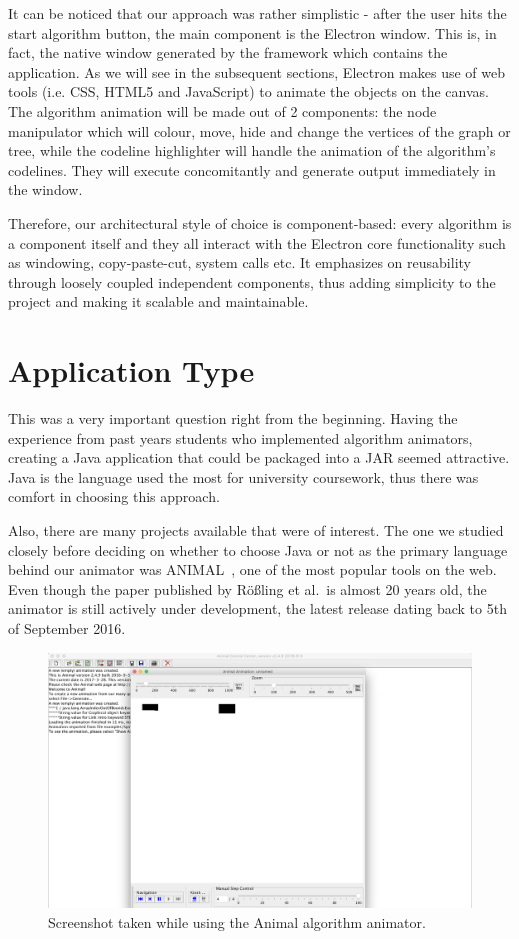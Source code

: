 \documentclass{l4proj}
\begin{document}
It can be noticed that our approach was rather simplistic - after the user hits the start algorithm button, the main
component is the Electron window. This is, in fact, the native window generated by the framework which contains the application. As we will see in the subsequent sections, Electron makes use of web tools (i.e. CSS, HTML5 and JavaScript) to animate the objects on the
canvas. The algorithm animation will be made out of 2 components: the node manipulator which will colour, move,
hide and change the vertices of the graph or tree, while the codeline highlighter will handle the animation of the
algorithm's codelines. They will execute concomitantly and generate output immediately in the window.

Therefore, our architectural style of choice is component-based: every algorithm is a component itself and they all
interact with the Electron core functionality such as windowing, copy-paste-cut, system calls etc. It emphasizes on
reusability through loosely coupled independent components, thus adding simplicity to the project and making it
scalable and maintainable.

\section{Application Type}

This was a very important question right from the beginning. Having the experience from past years students who
implemented algorithm animators, creating a Java application that could be packaged into a JAR seemed attractive. Java is the
language used the most for university coursework, thus there was comfort in choosing this approach.

Also, there are many projects available that were of interest. The one we studied closely before deciding on whether to
choose Java or not as the primary language behind our animator was ANIMAL~\cite{animal-algo-animation}, one of the most popular tools on the
web. Even though the paper published by Rößling et al.\ is almost 20 years old, the animator is still actively under
development, the latest release dating back to 5th of September 2016.

\begin{figure}[!ht]
    \centering
    \includegraphics[scale=0.25]{animal-algo-animator}
    \caption{Screenshot taken while using the Animal algorithm animator.}
    \label{fig:animal-algo-animator}
\end{figure}
\end{document}
